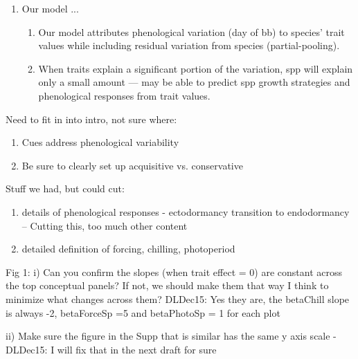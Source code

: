 \documentclass{article}
\begin{document}
\begin{enumerate}
\item Our model ...
\begin{enumerate}
\item Our model attributes phenological variation (day of bb) to species’ trait values while including residual variation from species (partial-pooling).
\item When traits explain a significant portion of the variation, spp will explain only a small amount — may be able to predict spp growth strategies and phenological responses from trait values.
\end{enumerate}
\end{enumerate}

Need to fit in into intro, not sure where:
\begin{enumerate}
\item Cues address phenological variability
\item Be sure to clearly set up acquisitive vs. conservative
\end{enumerate}

Stuff we had, but could cut:
\begin{enumerate}
\item details of phenological responses - ectodormancy transition to endodormancy -- Cutting this, too much other content
\item detailed definition of forcing, chilling, photoperiod
\end{enumerate}

Fig 1:
i) Can you confirm the slopes (when trait effect = 0) are constant across the top conceptual panels? If not, we should make them that way I think to minimize what changes across them?
DLDec15: Yes they are, the betaChill slope is always -2, betaForceSp =5 and betaPhotoSp = 1 for each plot

ii) Make sure the figure in the Supp that is similar has the same y axis scale -
DLDec15: I will fix that in the next draft for sure
\end{document}
